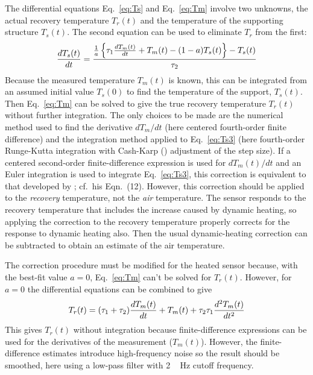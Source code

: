 \documentclass[amt, manuscript]{copernicus}
\begin{document}
The differential equations Eq.~\eqref{eq:Ts} and Eq.~\eqref{eq:Tm}
involve two unknowns, the actual recovery temperature \(T_{r}(t)\) and
the temperature of the supporting structure \(T_{s}(t)\). The second
equation can be used to eliminate \(T_{r}\) from the first:
\begin{equation}
\frac{dT_{s}(t)}{dt}=\frac{\frac{1}{a}\left\{ \tau_{1}\frac{dT_{m}(t)}{dt}+T_{m}(t)-(1-a)T_{s}(t)\right\} -T_{s}(t)}{\tau_{2}}{\label{eq:Ts3}}
\end{equation} Because the measured temperature \(T_{m}(t)\) is known,
this can be integrated from an assumed initial value \(T_{s}(0)\) to
find the temperature of the support, \(T_{s}(t)\). Then
Eq.~\eqref{eq:Tm} can be solved to give the true recovery temperature
\(T_{r}(t)\) without further integration. The only choices to be made
are the numerical method used to find the derivative \(dT_{m}/dt\) (here
centered fourth-order finite difference) and the integration method
applied to Eq.~\eqref{eq:Ts3} (here fourth-order Runge-Kutta integration
with Cash-Karp (\citet{cash1990variable}) adjustment of the step size).
If a centered second-order finite-difference expression is used for
\(dT_{m}(t)/dt\) and an Euler integration is used to integrate
Eq.~\eqref{eq:Ts3}, this correction is equivalent to that developed by
\citet{InverarityJTech2000}; cf.~his Eqn.~(12). However, this correction
should be applied to the \emph{recovery }temperature, not the \emph{air
}temperature. The sensor responds to the recovery temperature that
includes the increase caused by dynamic heating, so applying the
correction to the recovery temperature properly corrects for the
response to dynamic heating also. Then the usual dynamic-heating
correction can be subtracted to obtain an estimate of the air
temperature.

The correction procedure must be modified for the heated sensor because,
with the best-fit value \(a=0\), Eq.~\eqref{eq:Tm} can't be solved for
\(T_{r}(t)\). However, for \(a=0\) the differential equations can be
combined to give \begin{equation}
T_{r}(t)=(\tau_{1}+\tau_{2})\frac{dT_{m}(t)}{dt}+T_{m}(t)+\tau_{2}\tau_{1}\frac{d^{2}T_{m}(t)}{dt^{2}}{\label{eq:HARCOsoln}}
\end{equation} This gives \(T_{r}(t)\) without integration because
finite-difference expressions can be used for the derivatives of the
measurement (\(T_{m}(t)\)). However, the finite-difference estimates
introduce high-frequency noise so the result should be smoothed, here
using a low-pass filter with \unit{2\,Hz} cutoff frequency.
\end{document}
